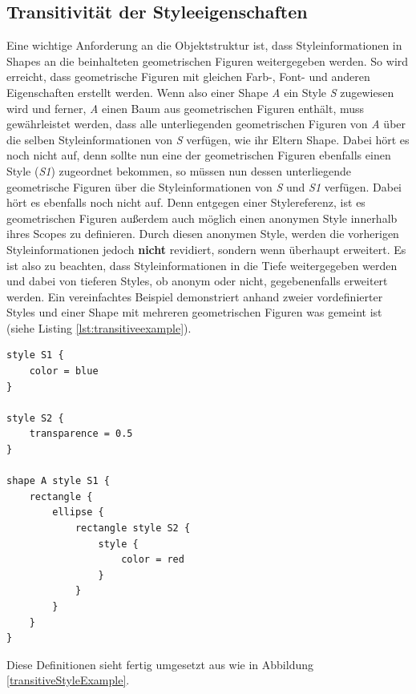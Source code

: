 \subsection{Transitivität der Styleeigenschaften}\label{transitivestyle}
Eine wichtige Anforderung an die Objektstruktur ist, dass Styleinformationen in Shapes an die beinhalteten geometrischen Figuren weitergegeben werden. So wird erreicht, dass geometrische Figuren mit gleichen Farb-, Font- und anderen Eigenschaften erstellt werden. Wenn also einer Shape \textit{A} ein Style \textit{S} zugewiesen wird und ferner, \textit{A} einen Baum aus geometrischen Figuren enthält, muss gewährleistet werden, dass alle unterliegenden geometrischen Figuren von \textit{A} über die selben Styleinformationen von \textit{S} verfügen, wie ihr Eltern Shape.
Dabei hört es noch nicht auf, denn sollte nun eine der geometrischen Figuren ebenfalls einen Style (\textit{S1}) zugeordnet bekommen, so müssen nun dessen unterliegende geometrische Figuren über die Styleinformationen von \textit{S} und \textit{S1} verfügen.
Dabei hört es ebenfalls noch nicht auf. Denn entgegen einer Stylereferenz, ist es geometrischen Figuren außerdem auch möglich einen anonymen Style innerhalb ihres Scopes zu definieren. Durch diesen anonymen Style, werden die vorherigen Styleinformationen jedoch \textbf{nicht} revidiert, sondern wenn überhaupt erweitert. Es ist also zu beachten, dass Styleinformationen in die Tiefe weitergegeben werden und dabei von tieferen Styles, ob anonym oder nicht, gegebenenfalls erweitert werden.
Ein vereinfachtes Beispiel demonstriert anhand zweier vordefinierter Styles und einer Shape mit mehreren geometrischen Figuren was gemeint ist (siehe Listing \ref{lst:transitiveexample}).
\begin{lstlisting}[style=spray, caption = {Beispiel zur Verdeutlichung transitiver Styleeigenschaften}, label = {lst:transitiveexample}]
style S1 {
    color = blue
}

style S2 {
	transparence = 0.5
}

shape A style S1 {
    rectangle {
        ellipse {
            rectangle style S2 {	
            	style {
            	    color = red
            	}
            }
        }
    }
}
\end{lstlisting}Diese Definitionen sieht fertig umgesetzt aus wie in Abbildung \ref{transitiveStyleExample}.
